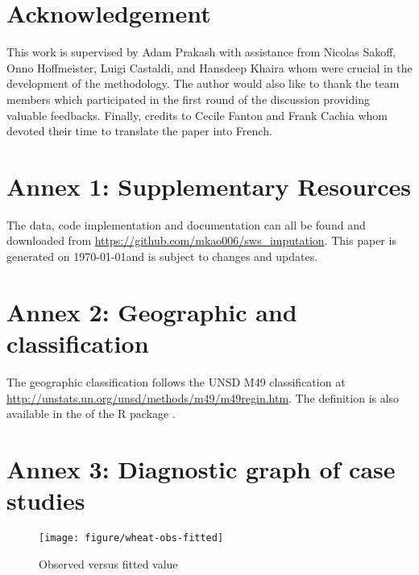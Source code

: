 \documentclass[nojss]{jss}\usepackage[]{graphicx}\usepackage[]{color}
\makeatletter
\def\maxwidth{ %
  \ifdim\Gin@nat@width>\linewidth
    \linewidth
  \else
    \Gin@nat@width
  \fi
}
\newenvironment{knitrout}{}{} %
\makeatother
\begin{document}
\section*{Acknowledgement}
This work is supervised by Adam Prakash with assistance from Nicolas
Sakoff, Onno Hoffmeister, Luigi Castaldi, and Hansdeep Khaira whom
were crucial in the development of the methodology. The author would
also like to thank the team members which participated in the first
round of the discussion providing valuable feedbacks. Finally, credits
to Cecile Fanton and Frank Cachia whom devoted their time to translate
the paper into French.

\section*{Annex 1: Supplementary Resources}

The data, code implementation and documentation can all be found and
downloaded from \url{https://github.com/mkao006/sws_imputation}. This
paper is generated on \today and is subject to changes and updates.


\section*{Annex 2: Geographic and classification}

The geographic classification follows the UNSD M49 classification at
\url{http://unstats.un.org/unsd/methods/m49/m49regin.htm}. The
definition is also available in the  of the R
package .



\section*{Annex 3: Diagnostic graph of case studies}

\begin{knitrout}
\color{fgcolor}\begin{figure}[!ht]


{\centering \texttt{[image: figure/wheat-obs-fitted]} 

}

\caption[Observed versus fitted value]{Observed versus fitted value\label{fig:wheat-obs-fitted}}
\end{figure}


\end{knitrout}
\end{document}
